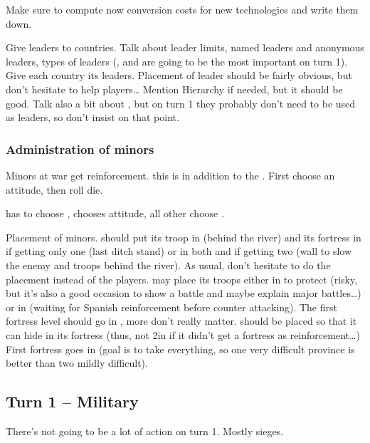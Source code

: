 \aparag Make sure to compute now conversion costs for new technologies and
write them down.

\aparag Give leaders to countries.
\bparag Talk about leader limits, named leaders and anonymous leaders, types
of leaders (\LeaderG, \LeaderE and \LeaderC are going to be the most important
on turn 1).
\bparag Give each country its leaders.
\bparag Placement of leader should be fairly obvious, but don't hesitate to
help players\ldots
\bparag Mention Hierarchy if needed, but it should be good. Talk also a bit
about \Pashas, but on turn 1 they probably don't need to be used as leaders,
so don't insist on that point.

\subsubsection{Administration of minors}
\aparag Minors at war get reinforcement.
\bparag this is in addition to the .
\bparag First choose an attitude, then roll die.

\aparag \paysEcosse has to choose , \paysSavoie chooses
 attitude, all other choose .

\aparag Placement of minors.
\bparag \paysCosaquesdon should put its troop in \provinceDon (behind the
river) and its fortress in \provinceDon if getting only one (last ditch stand)
or in both  and \provinceDonets if getting two (wall to
slow the enemy and troops behind the river). As usual, don't hesitate to do
the placement instead of the players.
\bparag \paysNaples may place its troops either in \provinceCampania to
protect \villeNaples (risky, but it's also a good occasion to show a battle
and maybe explain major battles\ldots) or in \provinceBasilicata (waiting for
Spanish reinforcement before counter attacking). The first fortress level
should go in \villeNaples, more don't really matter.
\bparag \paysGeorgie should be placed so that it can hide in its fortress
(thus, not 2\LD in \provinceGeorgie if it didn't get a fortress as
reinforcement\ldots) First fortress goes in \provinceGeorgie (\TUR goal is to
take everything, so one very difficult province is better than two mildly
difficult).

\subsection{Turn 1 -- Military}
\aparag There's not going to be a lot of action on turn 1. Mostly sieges.

